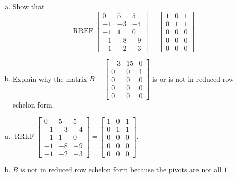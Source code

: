 
\begin{exerciseStatement}

\begin{enumerate}[(a)]
\item Show that \[\operatorname{RREF} \left[\begin{array}{ccc}
0 & 5 & 5 \\
-1 & -3 & -4 \\
-1 & 1 & 0 \\
-1 & -8 & -9 \\
-1 & -2 & -3
\end{array}\right] = \left[\begin{array}{ccc}
1 & 0 & 1 \\
0 & 1 & 1 \\
0 & 0 & 0 \\
0 & 0 & 0 \\
0 & 0 & 0
\end{array}\right] .\]
\item Explain why the matrix \(B= \left[\begin{array}{ccc}
-3 & 15 & 0 \\
0 & 0 & 1 \\
0 & 0 & 0 \\
0 & 0 & 0 \\
0 & 0 & 0
\end{array}\right] \) is or is not in reduced row echelon form.
\end{enumerate}
    
\end{exerciseStatement}
    
\begin{exerciseAnswer} 

\begin{enumerate}[(a)]
\item \(\operatorname{RREF} \left[\begin{array}{ccc}
0 & 5 & 5 \\
-1 & -3 & -4 \\
-1 & 1 & 0 \\
-1 & -8 & -9 \\
-1 & -2 & -3
\end{array}\right] = \left[\begin{array}{ccc}
1 & 0 & 1 \\
0 & 1 & 1 \\
0 & 0 & 0 \\
0 & 0 & 0 \\
0 & 0 & 0
\end{array}\right] .\)
\item \(B\) is not in reduced row echelon form because the pivots are not all \(1\). 
\end{enumerate}
    
\end{exerciseAnswer}
    
